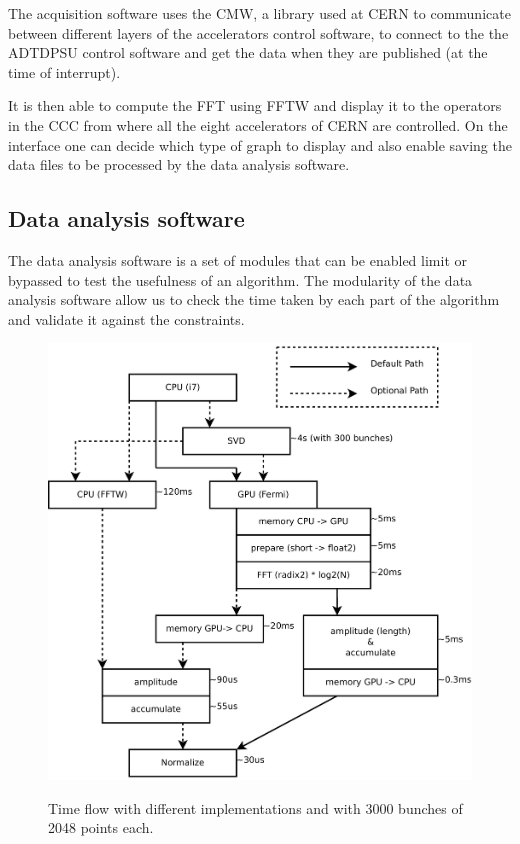 	The acquisition software uses the \gls{CMW}, a library used at \gls{CERN} to communicate between different layers of the accelerators control software, to connect to the the ADTDPSU control software and get the data when they are published (at the time of interrupt).

	It is then able to compute the \gls{FFT} using \gls{FFTW} and display it to the operators in the \gls{CCC} from where all the eight accelerators of \gls{CERN} are controlled. On the interface one can decide which type of graph to display and also enable saving the data files to be processed by the data analysis software.

	\subsection{Data analysis software}
	\label{sec:data_analysis_software}

	The data analysis software is a set of modules that can be enabled limit or bypassed to test the usefulness of an algorithm. The modularity of the data analysis software allow us to check the time taken by each part of the algorithm and validate it against the constraints.

	\begin{figure}[H]
	\caption{Time f\/low with different implementations and with 3000 bunches of 
	2048 points each.}
	\centering
	\includegraphics[scale=0.3]{PC-flow.pdf}
	\label{fig:PCFlow}
	\end{figure}

